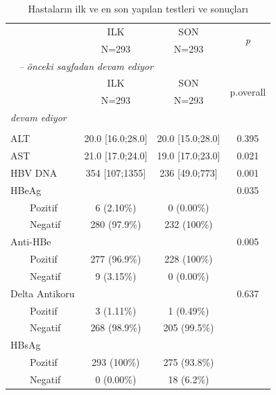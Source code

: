     \begin{longtable}{lccc}\caption{Hastaların ilk ve en son yapılan testleri ve sonuçları} \label{tablo:ilksonlab}\\
    \hline
     &       ILK        &       SON        & \multirow{2}{*}{\textit{p}}\\
 &      N=293       &      N=293       &           \\

    \hline
    \hline
    \endfirsthead
    \multicolumn{4}{l}{\tablename\ \thetable{} \textit{-- önceki sayfadan devam ediyor}}\\
    \hline
     &       ILK        &       SON        & \multirow{2}{*}{p.overall}\\
 &      N=293       &      N=293       &           \\

    \hline
    \hline
    \endhead
    \hline
    \multicolumn{4}{l}{\textit{devam ediyor}} \\
    \endfoot
    \multicolumn{4}{l}{}  \\
    \endlastfoot
    ALT & 20.0 [16.0;28.0] & 20.0 [15.0;28.0] &   0.395  \\
    AST & 21.0 [17.0;24.0] & 19.0 [17.0;23.0] &   0.021  \\
    HBV DNA &  354 [107;1355]  &  236 [49.0;773]  &   0.001   \\
    HBeAg &                  &                  &   0.035  \\
    $\qquad$Pozitif &    6 (2.10\%)     &    0 (0.00\%)     &          \\
    $\qquad$Negatif &   280 (97.9\%)    &    232 (100\%)    &          \\
Anti-HBe &                  &                  &   0.005  \\
$\qquad$Pozitif &   277 (96.9\%)    &    228 (100\%)    &          \\
$\qquad$Negatif &    9 (3.15\%)     &    0 (0.00\%)     &          \\
Delta Antikoru &                  &                  &   0.637  \\
$\qquad$Pozitif &    3 (1.11\%)     &    1 (0.49\%)     &          \\
$\qquad$Negatif &   268 (98.9\%)    &   205 (99.5\%)    &          \\
HBsAg & & & \\
$\qquad$Pozitif &    293 (100\%)     &    275 (93.8\%)     &          \\
$\qquad$Negatif &    0 (0.00\%)    &   18 (6.2\%)    &          \\


    \hline
    \end{longtable}

